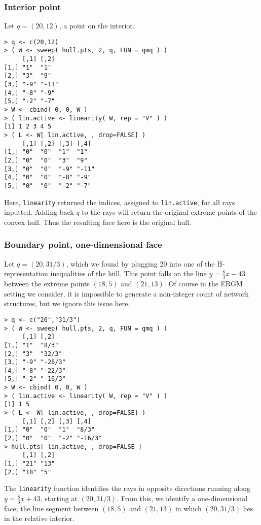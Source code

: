 \subsubsection{Interior point}
Let $q = (20,12)$, a point on the interior.
{ \singlespace
\begin{verbatim}
> q <- c(20,12)
> ( W <- sweep( hull.pts, 2, q, FUN = qmq ) )
     [,1] [,2] 
[1,] "1"  "1"  
[2,] "3"  "9"  
[3,] "-9" "-11"
[4,] "-8" "-9" 
[5,] "-2" "-7" 
> W <- cbind( 0, 0, W )
> ( lin.active <- linearity( W, rep = "V" ) )
[1] 1 2 3 4 5
> ( L <- W[ lin.active, , drop=FALSE] )
     [,1] [,2] [,3] [,4] 
[1,] "0"  "0"  "1"  "1"  
[2,] "0"  "0"  "3"  "9"  
[3,] "0"  "0"  "-9" "-11"
[4,] "0"  "0"  "-8" "-9" 
[5,] "0"  "0"  "-2" "-7" 
\end{verbatim}
}
Here, \texttt{linearity} returned the indices, assigned to \texttt{lin.active}, 
for all rays inputted.  Adding
back $q$ to the rays will return the original extreme points of the convex hull.
Thus the resulting face here is the original hull.

\subsubsection{Boundary point, one-dimensional face}
Let $q = (20,31/3)$, which we found by plugging 20 into one of the H-representation
inequalities of the hull.  This point falls on the line $y = \frac{8}{3}x - 43$ between
the extreme points $(18,5)$ and $(21,13)$. Of course in the ERGM setting we consider,
it is impossible to generate a non-integer count of network structures,
but we ignore this issue here.
{\singlespace
\begin{verbatim}
> q <- c("20","31/3")
> ( W <- sweep( hull.pts, 2, q, FUN = qmq ) )
     [,1] [,2]   
[1,] "1"  "8/3"  
[2,] "3"  "32/3" 
[3,] "-9" "-28/3"
[4,] "-8" "-22/3"
[5,] "-2" "-16/3"
> W <- cbind( 0, 0, W )
> ( lin.active <- linearity( W, rep = "V" ) )
[1] 1 5
> ( L <- W[ lin.active, , drop=FALSE] )
     [,1] [,2] [,3] [,4]   
[1,] "0"  "0"  "1"  "8/3"  
[2,] "0"  "0"  "-2" "-16/3"
> hull.pts[ lin.active, , drop=FALSE ]
     [,1] [,2]
[1,] "21" "13"
[2,] "18" "5" 
\end{verbatim}
}
The \texttt{linearity} function identifies the rays in opposite directions
running along $y = \frac{8}{3}x + 43$, starting at $(20,31/3)$.  From this, we
identify a one-dimensional face, the line segment between $(18,5)$ and $(21,13)$
in which $(20,31/3)$ lies in the relative interior.

